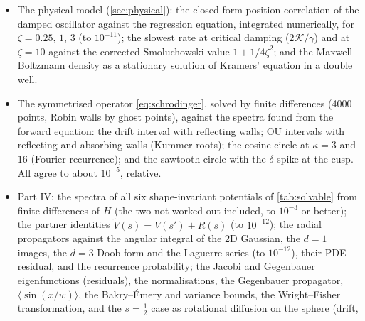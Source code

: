 \documentclass[11pt]{article}
\numberwithin{equation}{section}
\newcommand{\avg}[1]{\langle #1\rangle}
\begin{document}
\begin{itemize}
\begin{itemize}
          \item the $L\to0$ and $L\to\infty$ limits of every slowest rate;
          \item $\lambda_0T(0)\to1$ for Kramers;
          \item the constant $\ln2+\gamma_{\rm E}/2$;
          \item the heavy-tailed QSDs $q_\nu$: normalisation, eigen-equation residual, tail exponent $-1-\nu$,
                and exact evolution as $e^{-\nu kt}q_\nu$ through the map.
        \end{itemize}
        The interval eigenvalues come from root-finding on the Kummer functions \cref{eq:kummer} with
        \texttt{scipy.special.hyp1f1}. They were checked against \texttt{mpmath} to machine precision.
  \item The physical model (\cref{sec:physical}): the closed-form position correlation of the damped oscillator
        against the regression equation, integrated numerically, for $\zeta=0.25$, $1$, $3$ (to $10^{-11}$); the
        slowest rate at critical damping ($2\mathcal K/\gamma$) and at $\zeta=10$ against the corrected Smoluchowski
        value $1+1/4\zeta^2$; and the Maxwell--Boltzmann density as a stationary solution of Kramers' equation in a
        double well.
  \item The symmetrised operator \cref{eq:schrodinger}, solved by finite differences (4000 points, Robin
        walls by ghost points), against the spectra found from the forward equation: the drift interval with
        reflecting walls; OU intervals with reflecting and absorbing walls (Kummer roots); the cosine circle at
        $\kappa=3$ and $16$ (Fourier recurrence); and the sawtooth circle with the $\delta$-spike at the cusp. All
        agree to about $10^{-5}$, relative.
  \item Part IV: the spectra of all six shape-invariant potentials of \cref{tab:solvable} from finite differences
        of $H$ (the two not worked out included, to $10^{-3}$ or better); the partner identities
        $\tilde V(s)=V(s')+R(s)$ (to $10^{-12}$); the radial propagators against the angular integral of the 2D
        Gaussian, the $d=1$ images, the $d=3$ Doob form and the Laguerre series (to $10^{-12}$), their PDE
        residual, and the recurrence probability; the Jacobi and Gegenbauer eigenfunctions (residuals), the
        normalisations, the Gegenbauer propagator, $\avg{\sin(x/w)}$, the Bakry--\'Emery and variance bounds, the
        Wright--Fisher transformation, and the $s=\frac12$ case as rotational diffusion on the sphere (drift,

\end{itemize}
\end{document}
